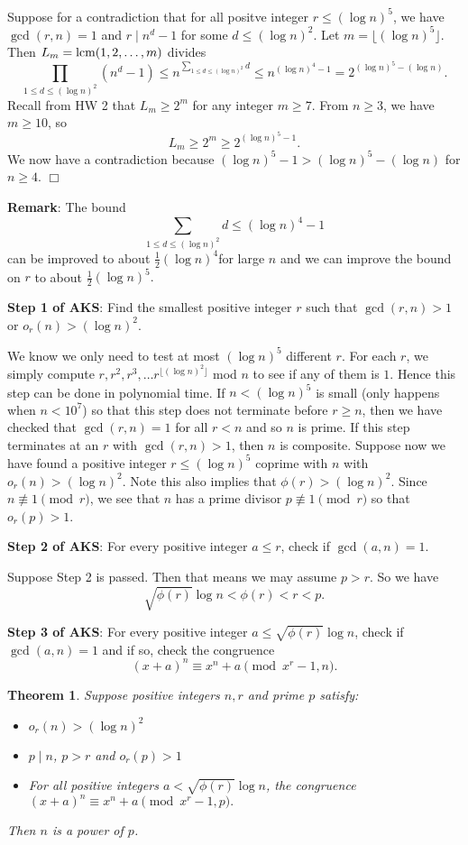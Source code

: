 \documentclass{article}
\def\lcm{{\rm lcm}}
\def\v{{\vspace{5pt}}}
\newtheorem{theorem}[subsection]{Theorem}
\newenvironment{proof}{\noindent {\bf Proof:}}{$\Box$ \vspace{2 ex}}
\begin{document}
\begin{proof}
    Suppose for a contradiction that for all positve integer $r\leq (\log n)^5$, we have $\gcd(r,n) = 1$ and $r\mid n^d - 1$ for some $d\leq (\log n)^2$. Let $m = \lfloor(\log n)^5\rfloor$. Then $L_m = \lcm(1,2,\ldots,m)$ divides
    $$\prod_{1\leq d\leq (\log n)^2} (n^d - 1) \leq n^{\sum_{1\leq d\leq (\log n)^2}d} \leq n^{(\log n)^4 - 1} = 2^{(\log n)^5 - (\log n)}.$$
    Recall from HW 2 that $L_{m}\geq 2^m$ for any integer $m\geq7$. From $n\geq 3$, we have $m\geq 10$, so $$L_m\geq 2^m\geq 2^{(\log n)^5 - 1}.$$
    We now have a contradiction because $(\log n)^5 - 1 > (\log n)^5 - (\log n)$ for $n\geq 4$.
\end{proof}

\noindent\textbf{Remark}: The bound $$\displaystyle\sum_{1\leq d\leq (\log n)^2}d \leq (\log n)^4 - 1$$ can be improved to about $\frac12(\log n)^4$for large $n$ and we can improve the bound on $r$ to about $\frac12(\log n)^5.$

\vspace{5pt}
\noindent\textbf{Step 1 of AKS}: Find the smallest positive integer $r$ such that $\gcd(r,n) > 1$ or $o_r(n) > (\log n)^2$. 

\v
We know we only need to test at most $(\log n)^5$ different $r$. For each $r$, we simply compute $r, r^2, r^3, \ldots r^{\lfloor(\log n)^2\rfloor}$ mod $n$ to see if any of them is $1$. Hence this step can be done in polynomial time. If $n<(\log n)^5$ is small (only happens when $n < 10^7$) so that this step does not terminate before $r \geq n$, then we have checked that $\gcd(r,n) = 1$ for all $r < n$ and so $n$ is prime. If this step terminates at an $r$ with $\gcd(r,n) > 1$, then $n$ is composite. Suppose now we have found a positive integer $r\leq (\log n)^5$ coprime with $n$ with $o_r(n) > (\log n)^2$. Note this also implies that $\phi(r) > (\log n)^2$. Since $n\not\equiv 1\pmod{r}$, we see that $n$ has a prime divisor $p\not\equiv1\pmod{r}$ so that $o_r(p) > 1$.

\vspace{5pt}
\noindent\textbf{Step 2 of AKS}: For every positive integer $a \leq r$, check if $\gcd(a,n) = 1$.

\v
Suppose Step 2 is passed. Then that means we may assume $p > r$. So we have
$$\sqrt{\phi(r)}\log n < \phi(r) < r < p.$$

\vspace{5pt}
\noindent\textbf{Step 3 of AKS}: For every positive integer $a \leq \sqrt{\phi(r)}\log n$, check if $\gcd(a,n) = 1$ and if so, check the congruence
$$(x + a)^n \equiv x^n + a\pmod{x^r -1, n}.$$
\begin{theorem}\label{thm:mainAKS}
    Suppose positive integers $n,r$ and prime $p$ satisfy:
    \begin{itemize}
        \item $o_r(n) > (\log n)^2$
        \item $p\mid n$, $p> r$ and $o_r(p) > 1$
        \item For all positive integers $a < \sqrt{\phi(r)}\log n$, the congruence
        $(x + a)^n \equiv x^n + a\pmod{x^r -1, p}.$
    \end{itemize}
    Then $n$ is a power of $p$.
\end{theorem}
\end{document}
